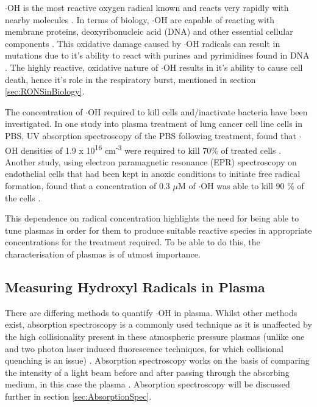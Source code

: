 \documentclass[11pt, oneside]{article}   	%
\begin{document}
$\cdot$OH is the most reactive oxygen radical known and reacts very rapidly with nearby molecules \cite{Halliwell2007}. 
In terms of biology, $\cdot$OH are capable of reacting with membrane proteins, deoxyribonucleic acid (DNA) and other essential cellular components \cite{Block2001}.
This oxidative damage caused by $\cdot$OH radicals can result in mutations due to it's ability to react with purines and pyrimidines found in DNA \cite{Dizdaroglu2012}. 
The highly reactive, oxidative nature of $\cdot$OH results in it's ability to cause cell death, hence it's role in the respiratory burst, mentioned in section \ref{sec:RONSinBiology}.

The concentration of $\cdot$OH required to kill cells and/inactivate bacteria have been investigated.
In one study into plasma treatment of lung cancer cell line cells in PBS, UV absorption spectroscopy of the PBS following treatment, found that $\cdot$OH densities of 1.9 x 10\textsuperscript{16} cm\textsuperscript{-3} were required to kill 70\% of treated cells \cite{Attri2015}.
Another study, using electron paramagnetic resonance (EPR) spectroscopy on endothelial cells that had been kept in anoxic conditions to initiate free radical formation, found that a concentration of 0.3 $\mu$M of $\cdot$OH was able to kill 90 \% of the cells \cite{Zweier1988}.

This dependence on radical concentration highlights the need for being able to tune plasmas in order for them to produce suitable reactive species in appropriate concentrations for the treatment required.
To be able to do this, the characterisation of plasmas is of utmost importance.

\subsection{Measuring Hydroxyl Radicals in Plasma}

There are differing methods to quantify $\cdot$OH in plasma.
Whilst other methods exist, absorption spectroscopy is a commonly used technique as it is unaffected by the high collisionality present in these atmospheric pressure plasmas (unlike one and two photon laser induced fluorescence techniques, for which collisional quenching is an issue) \cite{Schroter2015, BruggemanCS2012}.
Absorption spectroscopy works on the basis of comparing the intensity of a light beam before and after passing through the absorbing medium, in this case the plasma \cite{Reuter2015}.
Absorption spectroscopy will be discussed further in section \ref{sec:AbsorptionSpec}.
\end{document}
